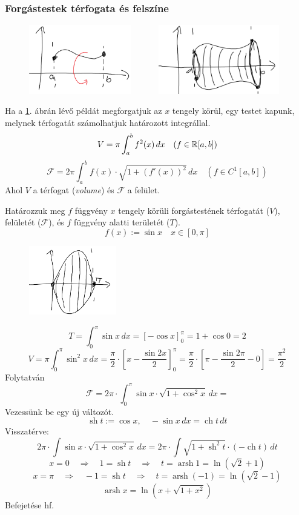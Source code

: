 \documentclass[a4paper,11.5pt]{article}
\DeclareMathOperator{\sh}{sh}
\DeclareMathOperator{\ch}{ch}
\DeclareMathOperator{\arsh}{arsh}
\begin{document}
	\subsubsection{Forgástestek térfogata és felszíne}
	\begin{revision}
		\begin{figure}[H]
			\centering
			\includegraphics[height=3cm]{kepek/15pre.png}$\quad \quad \quad $
			\includegraphics[height=3cm]{kepek/15.png}
			\caption{}\label{rotation}
		\end{figure}
		Ha a \ref{rotation}. ábrán lévő példát megforgatjuk az $x$ tengely körül, egy testet kapunk, melynek térfogatát számolhatjuk határozott integrállal.
		\[ V=\pi\int_a^bf^2(x)\,dx\quad (f\in\mathbb{R}[a,b]) \]
		\[ \mathcal{F}=2\pi\int_a^bf(x)\cdot\sqrt{1+(f'(x))^2}\,dx\quad (f\in C^1[a,b]) \]
		Ahol $V$ a térfogat (\textit{volume}) és $\mathcal{F}$ a felület.
	\end{revision}
	\begin{example} Határozzuk meg $f$ függvény $x$ tengely körüli forgástestének térfogatát ($V$), felületét ($\mathcal{F}$), és $f$ függvény alatti területét ($T$).
		\[ f(x):=\sin x\quad x\in[0,\pi]\]
		\begin{figure}[H]
			\centering
			\includegraphics[height=3cm]{kepek/16.png}
			\caption{}
		\end{figure}
		\vspace{-6mm}
		\[ T=\int_0^\pi\sin x\,dx=\left[-\cos x\right]_0^\pi=1+\cos 0=2 \]
		\[ V=\pi\int_0^\pi\sin^2x\,dx=\frac{\pi}{2}\cdot\left[x-\frac{\sin2x}{2}\right]_0^\pi=\frac{\pi}{2}\cdot\left[\pi-\frac{\sin2\pi}{2}-0\right]=\frac{\pi^2}{2} \]
		Folytatván
		\[ \mathcal{F}=2\pi\cdot\int_0^\pi \sin x\cdot\sqrt{ 1+\cos^2x}\,dx= \]
		Vezessünk be egy új változót.
		\[ \sh t:=\cos x,\quad -\sin x\,dx=\ch t\,dt \]
		Visszatérve:
		\[ 2\pi\cdot\int \sin x\cdot\sqrt{ 1+\cos^2x}\,dx=2\pi\cdot\int\sqrt{1+\sh^2t}\cdot(-\ch t)\,dt \]
		\[ x=0\quad \Rightarrow\quad 1=\sh t\quad \Rightarrow\quad t=\arsh 1=\ln(\sqrt{2}+1) \]
		\[ x=\pi\quad \Rightarrow\quad -1=\sh t\quad \Rightarrow\quad t=\arsh (-1)=\ln(\sqrt{2}-1) \]
		\[ \arsh x=\ln(x+\sqrt{1+x^2}) \]
		Befejetése hf.
	\end{example}
\end{document}
